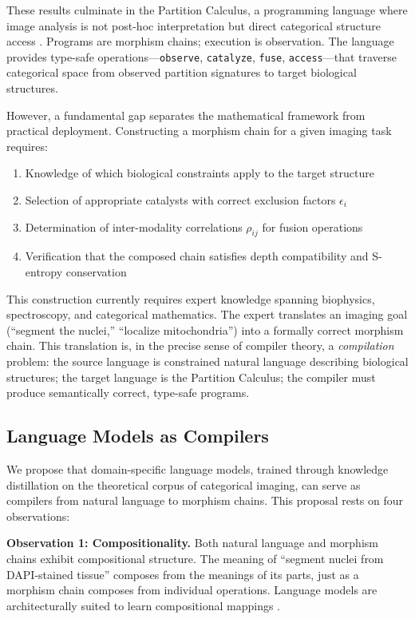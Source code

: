 \documentclass[11pt,twocolumn,a4paper]{article}
\theoremstyle{definition}
\theoremstyle{remark}
\begin{document}
These results culminate in the Partition Calculus, a programming language where image analysis is not post-hoc interpretation but direct categorical structure access \cite{partition2024}. Programs are morphism chains; execution is observation. The language provides type-safe operations---\texttt{observe}, \texttt{catalyze}, \texttt{fuse}, \texttt{access}---that traverse categorical space from observed partition signatures to target biological structures.

However, a fundamental gap separates the mathematical framework from practical deployment. Constructing a morphism chain for a given imaging task requires:
\begin{enumerate}
    \item Knowledge of which biological constraints apply to the target structure
    \item Selection of appropriate catalysts with correct exclusion factors $\epsilon_i$
    \item Determination of inter-modality correlations $\rho_{ij}$ for fusion operations
    \item Verification that the composed chain satisfies depth compatibility and S-entropy conservation
\end{enumerate}

This construction currently requires expert knowledge spanning biophysics, spectroscopy, and categorical mathematics. The expert translates an imaging goal (``segment the nuclei,'' ``localize mitochondria'') into a formally correct morphism chain. This translation is, in the precise sense of compiler theory, a \emph{compilation} problem: the source language is constrained natural language describing biological structures; the target language is the Partition Calculus; the compiler must produce semantically correct, type-safe programs.

\subsection{Language Models as Compilers}

We propose that domain-specific language models, trained through knowledge distillation on the theoretical corpus of categorical imaging, can serve as compilers from natural language to morphism chains. This proposal rests on four observations:

\textbf{Observation 1: Compositionality.} Both natural language and morphism chains exhibit compositional structure. The meaning of ``segment nuclei from DAPI-stained tissue'' composes from the meanings of its parts, just as a morphism chain composes from individual operations. Language models are architecturally suited to learn compositional mappings \cite{Vaswani2017}.
\end{document}
